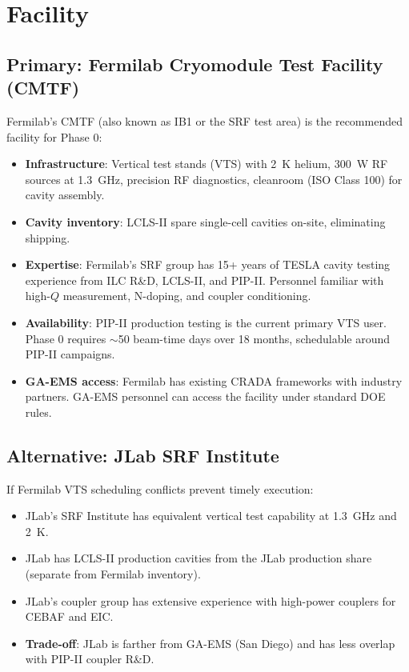 \documentclass[11pt]{article}
\begin{document}
\section{Facility}
\label{sec:facility}

\subsection{Primary: Fermilab Cryomodule Test Facility (CMTF)}

Fermilab's CMTF (also known as IB1 or the SRF test area) is the
recommended facility for Phase 0:

\begin{itemize}[nosep]
  \item \textbf{Infrastructure}: Vertical test stands (VTS) with
    2~K helium, 300~W RF sources at 1.3~GHz, precision RF
    diagnostics, cleanroom (ISO Class 100) for cavity assembly.
  \item \textbf{Cavity inventory}: LCLS-II spare single-cell
    cavities on-site, eliminating shipping.
  \item \textbf{Expertise}: Fermilab's SRF group has 15+ years of
    TESLA cavity testing experience from ILC R\&D, LCLS-II, and
    PIP-II. Personnel familiar with high-$Q$ measurement, N-doping,
    and coupler conditioning.
  \item \textbf{Availability}: PIP-II production testing is the
    current primary VTS user. Phase 0 requires $\sim$50 beam-time
    days over 18 months, schedulable around PIP-II campaigns.
  \item \textbf{GA-EMS access}: Fermilab has existing CRADA
    frameworks with industry partners. GA-EMS personnel can access
    the facility under standard DOE rules.
\end{itemize}

\subsection{Alternative: JLab SRF Institute}

If Fermilab VTS scheduling conflicts prevent timely execution:

\begin{itemize}[nosep]
  \item JLab's SRF Institute has equivalent vertical test capability
    at 1.3~GHz and 2~K.
  \item JLab has LCLS-II production cavities from the JLab production
    share (separate from Fermilab inventory).
  \item JLab's coupler group has extensive experience with
    high-power couplers for CEBAF and EIC.
  \item \textbf{Trade-off}: JLab is farther from GA-EMS (San Diego)
    and has less overlap with PIP-II coupler R\&D.
\end{itemize}
\end{document}
